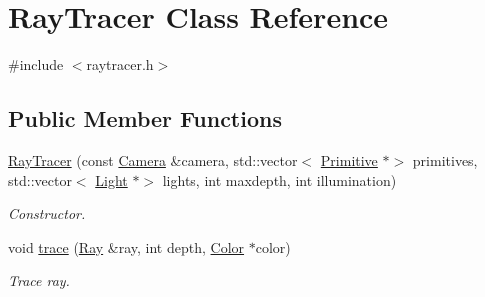 \hypertarget{class_ray_tracer}{}\section{Ray\+Tracer Class Reference}
\label{class_ray_tracer}


{\ttfamily \#include $<$raytracer.\+h$>$}

\subsection*{Public Member Functions}
\begin{DoxyCompactItemize}
\item 
\mbox{\label{class_ray_tracer_a1981c0e5a621ea11dc37f8b072562ca8}} 
\mbox{\hyperlink{class_ray_tracer_a1981c0e5a621ea11dc37f8b072562ca8}{Ray\+Tracer}} (const \mbox{\hyperlink{class_camera}{Camera}} \&camera, std\+::vector$<$ \mbox{\hyperlink{class_primitive}{Primitive}} $\ast$$>$ primitives, std\+::vector$<$ \mbox{\hyperlink{class_light}{Light}} $\ast$$>$ lights, int maxdepth, int illumination)
\begin{DoxyCompactList}\small\item\em Constructor. \end{DoxyCompactList}\item 
\mbox{\label{class_ray_tracer_a6ff3cb8f226127037366ade6aeff95e5}} 
void \mbox{\hyperlink{class_ray_tracer_a6ff3cb8f226127037366ade6aeff95e5}{trace}} (\mbox{\hyperlink{class_ray}{Ray}} \&ray, int depth, \mbox{\hyperlink{class_color}{Color}} $\ast$color)
\begin{DoxyCompactList}\small\item\em Trace ray. \end{DoxyCompactList}\end{DoxyCompactItemize}
